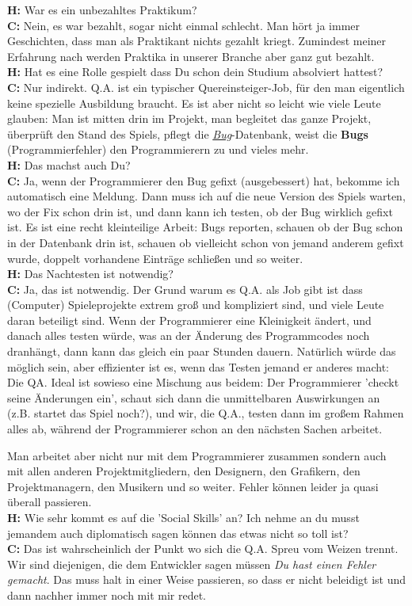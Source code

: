 \documentclass[10pt,a4paper,ngerman,twoside]{article} %
\begin{document}
\begin{multicols}{3}
\textbf{H:} War es ein unbezahltes Praktikum? \\
\textbf{C:} Nein, es war bezahlt, sogar nicht einmal schlecht. Man hört ja immer Geschichten, dass man als Praktikant nichts gezahlt kriegt. Zumindest meiner Erfahrung nach werden Praktika in unserer Branche aber ganz gut bezahlt. \\
\textbf{H:} Hat es eine Rolle gespielt dass Du schon dein Studium absolviert hattest? \\
\textbf{C:} Nur indirekt. Q.A. ist ein typischer Quereinsteiger-Job, für den man eigentlich keine spezielle Ausbildung braucht. Es ist aber nicht so leicht wie viele Leute glauben: Man ist mitten drin im Projekt, man begleitet das ganze Projekt, überprüft den Stand des Spiels, pflegt die \href{https://de.wikipedia.org/wiki/Programmfehler}{\textit{Bug}}-Datenbank, weist die \textbf{Bugs} (Programmierfehler) den Programmierern zu und vieles mehr.  \\
\textbf{H:} Das machst auch Du? \\
\textbf{C:} Ja, wenn der Programmierer den Bug gefixt (ausgebessert) hat, bekomme ich automatisch eine Meldung. Dann muss ich auf die neue Version des Spiels warten, wo der Fix schon drin ist, und dann kann ich testen, ob der Bug wirklich gefixt ist. Es ist eine recht kleinteilige Arbeit: Bugs reporten, schauen ob der Bug schon in der Datenbank drin ist, schauen ob vielleicht schon von jemand anderem gefixt wurde, doppelt vorhandene Einträge schließen und so weiter. \\
\textbf{H:} Das Nachtesten ist notwendig? \\
\textbf{C:} Ja, das ist notwendig. Der Grund warum es Q.A. als Job gibt ist dass (Computer) Spieleprojekte extrem groß und kompliziert sind, und viele Leute daran beteiligt sind. Wenn der Programmierer eine Kleinigkeit ändert, und danach alles testen würde, was  an der Änderung des Programmcodes noch dranhängt, dann kann das  gleich ein paar Stunden dauern. Natürlich würde das möglich sein, aber effizienter ist es, wenn das Testen jemand er anderes macht: Die QA. Ideal ist sowieso eine Mischung aus beidem: Der Programmierer 'checkt seine Änderungen ein', schaut sich dann die unmittelbaren Auswirkungen an (z.B. startet das Spiel noch?), und wir, die Q.A., testen dann im großem Rahmen alles ab, während der Programmierer schon an den nächsten Sachen arbeitet.

Man arbeitet aber nicht nur mit dem Programmierer zusammen sondern auch mit allen anderen Projektmitgliedern, den Designern, den Grafikern, den Projektmanagern, den Musikern und so weiter. Fehler können leider ja quasi überall passieren. \\
\textbf{H:} Wie sehr kommt es auf die 'Social Skills' an? Ich nehme an du musst jemandem auch diplomatisch sagen können das etwas nicht so toll ist? \\
\textbf{C:} Das ist wahrscheinlich der Punkt wo sich die Q.A. Spreu vom Weizen trennt. Wir sind diejenigen, die dem Entwickler sagen müssen \emph{Du hast einen Fehler gemacht}. Das muss halt in einer Weise passieren, so dass er nicht beleidigt ist und dann nachher immer noch mit mir redet.


\end{multicols}
\end{document}
